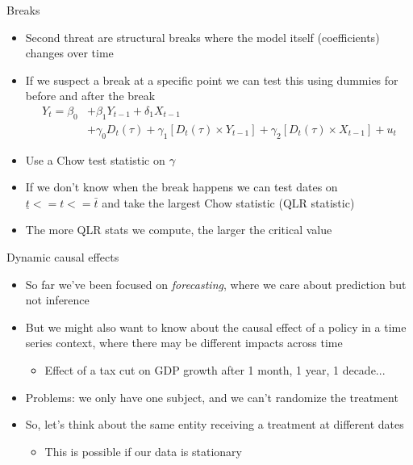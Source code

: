 \documentclass[aspectratio=169]{beamer}
\begin{document}
\begin{frame}{Breaks}
    \begin{itemize}
        \item Second threat are structural breaks where the model itself (coefficients) changes over time
        \item If we suspect a break at a specific point we can test this using dummies for before and after the break
        $$
        \begin{aligned}
            Y_t=\beta_0 & +\beta_1 Y_{t-1}+\delta_1 X_{t-1} \\
            & +\gamma_0 D_t(\tau)+\gamma_1\left[D_t(\tau) \times Y_{t-1}\right]+\gamma_2\left[D_t(\tau) \times X_{t-1}\right]+u_t
            \end{aligned}
        $$
        \item Use a Chow test statistic on $\bf{\gamma}$
        \item If we don't know when the break happens we can test dates on $\underline{t} <= t <= \bar{t}$ and take the largest Chow statistic (QLR statistic)
        \item The more QLR stats we compute, the larger the critical value
    \end{itemize}
\end{frame}

\begin{frame}{Dynamic causal effects}
    \begin{itemize}
        \item So far we've been focused on \textit{forecasting}, where we care about prediction but not inference 
        \item But we might also want to know about the causal effect of a policy in a time series context, where there may be different impacts across time
        \begin{itemize}
            \item Effect of a tax cut on GDP growth after 1 month, 1 year, 1 decade...
        \end{itemize}
        \item Problems: we only have one subject, and we can't randomize the treatment
        \item So, let's think about the same entity receiving a treatment at different dates
        \begin{itemize}
            \item This is possible if our data is stationary
        \end{itemize}
    \end{itemize}
\end{frame}
\end{document}
